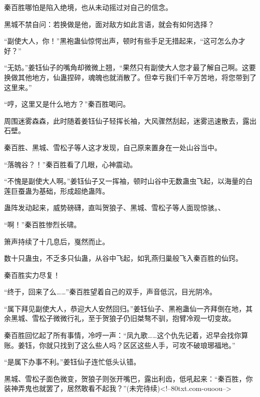 \begin{this_body}
秦百胜哪怕是陷入绝境，也从未动摇过对自己的信念。

黑城不禁自问：若换做是他，面对敌方如此言语，就会有如何选择？

“副使大人，你！”黑袍蛊仙惊愕出声，顿时有些手足无措起来，“这可怎么办才好？”

“无妨。”姜钰仙子的嘴角却微微上翘，“果然只有副使大人您才最了解自己啊。这要换做其他地方，仙蛊捏碎，魂魄也就消散了。但幸亏我们千辛万苦地，将您带到了这里来。”

“哼，这里又是什么地方？”秦百胜喝问。

周围迷雾森森，此时随着姜钰仙子轻挥长袖，大风骤然刮起，迷雾迅速散去，露出石壁。

秦百胜、黑城、雪松子等人这才发现，自己原来置身在一处山谷当中。

“落魄谷？！”秦百胜看了几眼，心神震动。

“不愧是副使大人啊。”姜钰仙子又一挥袖，顿时山谷中无数蛊虫飞起，以海量的白莲巨蚕蛊为基础，形成超绝蛊阵。

蛊阵发动起来，威势磅礴，直叫贺狼子、黑城、雪松子等人面现惊骇。、

“啊！”秦百胜惨烈长啸。

箫声持续了十几息后，戛然而止。

数十只蛊虫，不乏多只仙蛊，从谷中飞起，如乳燕归巢般飞入秦百胜的仙窍。

秦百胜实力尽复！

“终于，回来了么……”秦百胜望着自己的双手，声音低沉，目光阴冷。

“属下拜见副使大人，恭迎大人安然回归。”姜钰仙子、黑袍蛊仙一齐拜倒在地，其余黑城、雪松子微微行礼，至于贺狼子仍旧桀骜不驯，抱臂冷观一切变故。

秦百胜回忆起了所有事情，冷哼一声：“凤九歌……这个仇先记着，迟早会找你算账。姜钰，你就只找到了这么些人吗？区区这些人手，可攻不破琅琊福地。”

“是属下办事不利。”姜钰仙子连忙低头认错。

黑城、雪松子面色微变，贺狼子则张开嘴巴，露出利齿，低吼起来：“秦百胜，你装神弄鬼也就罢了，居然敢看不起我？”(未完待续)<!--80txt.com-ouoou-->

\end{this_body}

